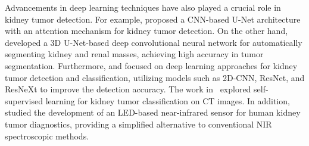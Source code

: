 Advancements in deep learning techniques have also played a crucial role in kidney tumor detection. For example, \cite{rathnayaka2019kidney} proposed a CNN-based U-Net architecture with an attention mechanism for kidney tumor detection. On the other hand, \cite{lin2021automated} developed a 3D U-Net-based deep convolutional neural network for automatically segmenting kidney and renal masses, achieving high accuracy in tumor segmentation. Furthermore, \cite{alzu2022kidney} and \cite{praveen2023resnet} focused on deep learning approaches for kidney tumor detection and classification, utilizing models such as 2D-CNN, ResNet, and ResNeXt to improve the detection accuracy. The work in~\cite{ozbay2024kidney} explored self-supervised learning for kidney tumor classification on CT images. In addition, \cite{bogomolov2017development} studied the development of an LED-based near-infrared sensor for human kidney tumor diagnostics, providing a simplified alternative to conventional NIR spectroscopic methods.


